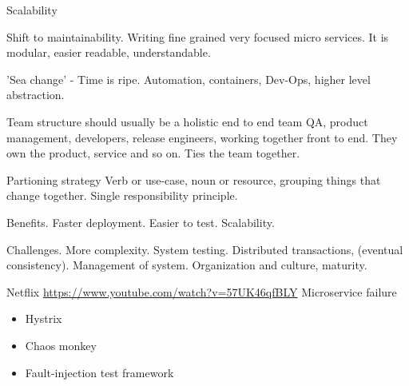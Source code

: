 Scalability 

Shift to maintainability. Writing fine grained very focused micro services. It is modular, easier readable, understandable.

'Sea change' - Time is ripe. Automation, containers, Dev-Ops, higher level abstraction.

Team structure should usually be a holistic end to end team QA, product management, developers, release engineers, working together front to end. They own the product, service and so on. Ties the team together.

Partioning strategy Verb or use-case, noun or resource, grouping things that change together. Single responsibility principle.

Benefits. Faster deployment. Easier to test. Scalability.

Challenges.
More complexity. System testing. Distributed transactions, (eventual consistency). Management of system.
Organization and culture, maturity.

Netflix
\url{https://www.youtube.com/watch?v=57UK46qfBLY}
Microservice failure
\begin{itemize}
\item Hystrix
\item Chaos monkey
\item Fault-injection test framework
\end{itemize}


